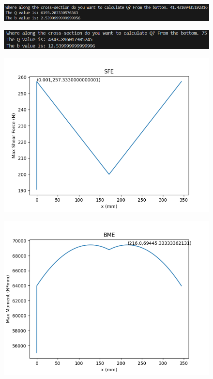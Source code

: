 \documentclass[11pt]{article}
\begin{document}
\begin{figure}[H]
    \centering
    \includegraphics[width=0.95\linewidth]{images/Code D0 2.png}
\end{figure}

\begin{figure}[H]
    \centering
    \includegraphics[width=0.95\linewidth]{images/Code D0 3.png}
\end{figure}

\begin{figure}[H]
    \centering
    \includegraphics[scale = 0.7]{images/SFE.png}
\end{figure}

\begin{figure}[H]
    \centering
    \includegraphics[scale = 0.7]{images/BME.png}
\end{figure}
\end{document}
